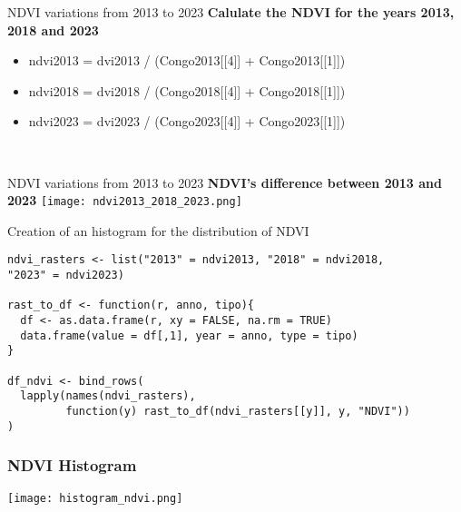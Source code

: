 \documentclass{beamer}
\begin{document}
\begin{frame}[fragile]{NDVI variations from 2013 to 2023}
  \textbf{Calulate the NDVI for the years 2013, 2018 and 2023}
  \vspace{0.5cm}
  \begin{itemize}
      \item ndvi2013 = dvi2013 / (Congo2013[[4]] + Congo2013[[1]])
      \item ndvi2018 = dvi2018 / (Congo2018[[4]] + Congo2018[[1]])
\item ndvi2023 = dvi2023 / (Congo2023[[4]] + Congo2023[[1]])
  \end{itemize}
  \centering
   \vspace{0.5cm}
  \
\end{frame}

\begin{frame}[fragile]{NDVI variations from 2013 to 2023}
  \textbf{NDVI's difference between 2013 and 2023}
  \vspace{0.5cm}
  \centering
   \vspace{0.5cm}
  \texttt{[image: ndvi2013\_2018\_2023.png]}
\end{frame}

\begin{frame}[fragile]{Creation of an histogram for the distribution of NDVI}
\footnotesize
\begin{lstlisting}
ndvi_rasters <- list("2013" = ndvi2013, "2018" = ndvi2018, 
"2023" = ndvi2023)

rast_to_df <- function(r, anno, tipo){
  df <- as.data.frame(r, xy = FALSE, na.rm = TRUE)
  data.frame(value = df[,1], year = anno, type = tipo)
}

df_ndvi <- bind_rows(
  lapply(names(ndvi_rasters),
         function(y) rast_to_df(ndvi_rasters[[y]], y, "NDVI"))
)
\end{lstlisting}
\end{frame}


\begin{frame}
\frametitle{NDVI Histogram}
\centering
\texttt{[image: histogram\_ndvi.png]}
\end{frame}
\end{document}
